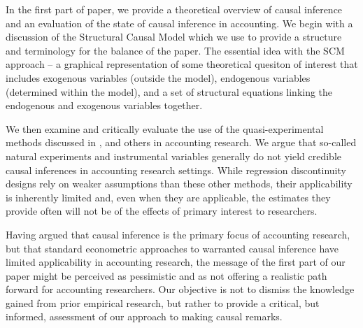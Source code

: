 \documentclass[11pt]{amsart}
\begin{document}
In the first part of paper, we provide a theoretical overview of causal inference and an evaluation of the state of causal inference in accounting. We begin with a discussion of the Structural Causal Model \citep{Pearl:2009kh} which we use to provide a structure and terminology for the balance of the paper.  
The essential idea with the SCM approach -- a graphical representation of some theoretical quesiton of interest that includes exogenous variables (outside the model), endogenous variables (determined within the model), and a set of structural equations linking the endogenous and exogenous variables together.  



We then examine and critically evaluate the use of the quasi-experimental methods discussed in \citet{Angrist:2010jv}, \citet{Roberts:2013cz} and others in accounting research.
We argue that so-called natural experiments and instrumental variables generally do not yield credible causal inferences in accounting research settings.
While regression discontinuity designs rely on weaker assumptions than these other methods, their applicability is inherently limited and, even when they are applicable, the estimates they provide often will not be of the effects of primary interest to researchers.

Having argued that causal inference is the primary focus of accounting research, but that standard econometric approaches to warranted causal inference have limited applicability in accounting research, the message of the first part of our paper might be perceived as pessimistic and as not offering a realistic path forward for accounting researchers.
Our objective is not to dismiss the knowledge gained from prior empirical research, but rather to provide a critical, but informed, assessment of our approach to making causal remarks.  
\end{document}
